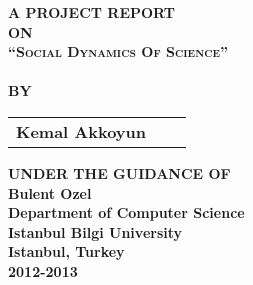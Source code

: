 \newpage
\begin{center}
\thispagestyle{empty}
\Large{\textbf{A PROJECT REPORT\\ \large{ON}}}\\[0.7cm]
\LARGE{\textsc {\textbf{``Social Dynamics Of Science''}}}\\[0.5cm]
\vspace{2.5cm}
\vspace{1cm}
\Large{\textbf{\\BY}}\\[0.5cm]
\begin{table}[h]
\centering
\Large{
\begin{tabular}{>{\bfseries}lc>{\bfseries}r}
Kemal Akkoyun & & \\
\end{tabular}}
\end{table}
\vspace{0.5cm}
\large{\textbf{UNDER THE GUIDANCE OF}}\\
\large{\textbf{Bulent Ozel}}\\
\vspace{1cm}
\large{\textbf{Department of Computer Science}}\\
\Large{\textbf{Istanbul Bilgi University}}\\
\large{\textbf{Istanbul, Turkey}}
\large{\textbf{\\2012-2013}}\\
\vspace{1cm}	
\newpage
\end{center}